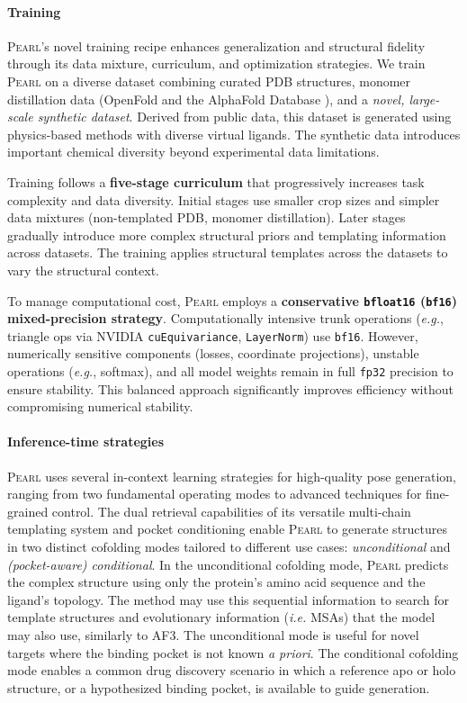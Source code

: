 \documentclass[11pt, letterpaper, onecolumn]{tau-class/tau}
\newcommand{\pearl}{\textsc{Pearl}\xspace}
\newcommand{\eg}{\textit{e.g.}\xspace}
\newcommand{\ie}{\textit{i.e.}\xspace}
\newcommand{\cuequivariance}{\texttt{cuEquivariance}\xspace}
\newcommand{\layernorm}{\texttt{LayerNorm}\xspace}
\begin{document}
\paragraph{Training}
\pearl's novel training recipe enhances generalization and structural fidelity through its data mixture, curriculum, and optimization strategies. We train \pearl on a diverse dataset combining curated PDB structures, monomer distillation data (OpenFold \cite{ahdritz2024openfold} and the AlphaFold Database \cite{varadi2024alphafold}), and a \textit{novel, large-scale synthetic dataset}. Derived from public data, this dataset is generated using physics-based methods with diverse virtual ligands. The synthetic data introduces important chemical diversity beyond experimental data limitations.

Training follows a \textbf{five-stage curriculum} that progressively increases task complexity and data diversity. Initial stages use smaller crop sizes and simpler data mixtures (non-templated PDB, monomer distillation). Later stages gradually introduce more complex structural priors and templating information across datasets. The training applies structural templates across the datasets to vary the structural context.

To manage computational cost, \pearl employs a \textbf{conservative \texttt{bfloat16} (\texttt{bf16}) mixed-precision strategy}. Computationally intensive trunk operations (\eg, triangle ops via NVIDIA \cuequivariance \cite{nvidia_cuequivariance_github}, \layernorm \cite{ba2016layer}) use \texttt{bf16}. However, numerically sensitive components (losses, coordinate projections), unstable operations (\eg, softmax), and all model weights remain in full \texttt{fp32} precision to ensure stability. This balanced approach significantly improves efficiency without compromising numerical stability.


\paragraph{Inference-time strategies}
\pearl uses several in-context learning strategies for high-quality pose generation, ranging from two fundamental operating modes to advanced techniques for fine-grained control. The dual retrieval capabilities of its versatile multi-chain templating system and pocket conditioning enable \pearl to generate structures in two distinct cofolding modes tailored to different use cases: \textit{unconditional} and \textit{(pocket-aware) conditional}.
In the unconditional cofolding mode, \pearl predicts the complex structure using only the protein's amino acid sequence and the ligand's topology. The method may use this sequential information to search for template structures and evolutionary information (\ie MSAs) that the model may also use, similarly to AF3. The unconditional mode is useful for novel targets where the binding pocket is not known \emph{a priori}.
The conditional cofolding mode enables a common drug discovery scenario in which a reference apo or holo structure, or a hypothesized binding pocket, is available to guide generation.
\end{document}
